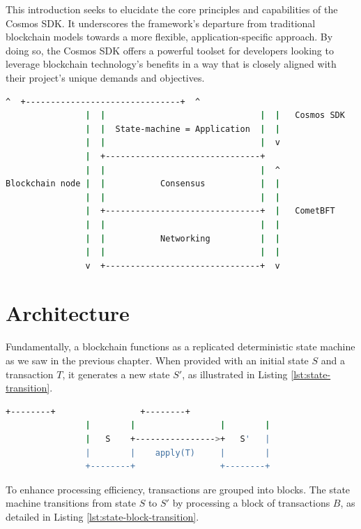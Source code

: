 This introduction seeks to elucidate the core principles and capabilities of the Cosmos SDK. It underscores the framework's departure from traditional blockchain models towards a more flexible, application-specific approach. By doing so, the Cosmos SDK offers a powerful toolset for developers looking to leverage blockchain technology's benefits in a way that is closely aligned with their project's unique demands and objectives.

\begin{lstlisting}[language=bash, caption=Application based blockchains. Source:\cite{app-based-blockchain},label={lst:app-based-blockchain}]
                ^  +-------------------------------+  ^
                |  |                               |  |   Cosmos SDK
                |  |  State-machine = Application  |  |
                |  |                               |  v
                |  +-------------------------------+
                |  |                               |  ^
Blockchain node |  |           Consensus           |  |
                |  |                               |  |
                |  +-------------------------------+  |   CometBFT
                |  |                               |  |
                |  |           Networking          |  |
                |  |                               |  |
                v  +-------------------------------+  v
\end{lstlisting}

\section{Architecture}

Fundamentally, a blockchain functions as a replicated deterministic state machine as we saw in the previous chapter. When provided with an initial state \(S\) and a transaction \(T\), it generates a new state \(S'\), as illustrated in Listing \ref{lst:state-transition}.

\begin{lstlisting}[language=bash, caption=State machine transition. Source:\cite{app-based-blockchain},label={lst:state-transition}]
                +--------+                 +--------+
                |        |                 |        |
                |   S    +---------------->+   S'   |
                |        |    apply(T)     |        |
                +--------+                 +--------+
\end{lstlisting}

To enhance processing efficiency, transactions are grouped into blocks. The state machine transitions from state \(S\) to \(S'\) by processing a block of transactions \(B\), as detailed in Listing \ref{lst:state-block-transition}.

